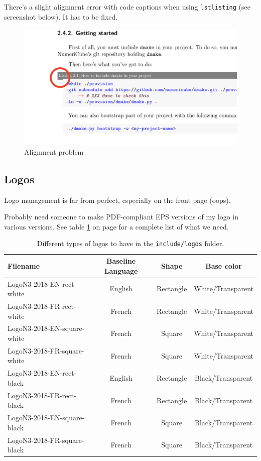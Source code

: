 There's a slight alignment error with code captions when using \texttt{lstlisting} (see screenshot below). It has to be fixed.

\begin{figure}
\includegraphics[width=\textwidth]{assets/alignmentpb.png}
\caption{Alignment problem}
\end{figure}


\subsection{Logos}

Logo management is far from perfect, especially on the front page (oops).

Probably need someone to make PDF-compliant EPS versions of my logo in various versions. See table \ref{table:logoformats} on page \pageref{table:logoformats} for a complete list of what we need.

\begin{table}[ht]
	\centering
	\begin{tabular}{@{}lccc@{}}
	\toprule
        Filename                        &   Baseline Language   &   Shape   & Base color \\ \midrule
        LogoN3-2018-EN-rect-white       &   English             & Rectangle & White/Transparent \\
        LogoN3-2018-FR-rect-white       &   French              & Rectangle & White/Transparent \\
        LogoN3-2018-EN-square-white     &   French              & Square    & White/Transparent \\
        LogoN3-2018-FR-square-white     &   French              & Square    & White/Transparent \\
        LogoN3-2018-EN-rect-black       &   English             & Rectangle & Black/Transparent \\
        LogoN3-2018-FR-rect-black       &   French              & Rectangle & Black/Transparent \\
        LogoN3-2018-EN-square-black     &   French              & Square    & Black/Transparent \\
        LogoN3-2018-FR-square-black     &   French              & Square    & Black/Transparent \\ \bottomrule
	\end{tabular}
	\caption{Different types of logos to have in the \texttt{include/logos} folder.}
	\label{table:logoformats}
\end{table}

